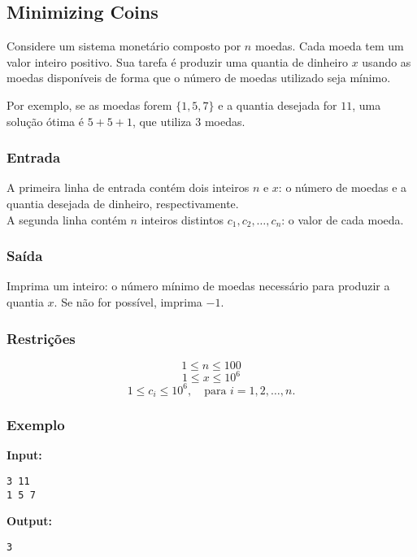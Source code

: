 \subsection{Minimizing Coins}
Considere um sistema monetário composto por \( n \) moedas. Cada moeda tem um valor inteiro positivo. Sua tarefa é produzir uma quantia de dinheiro \( x \) usando as moedas disponíveis de forma que o número de moedas utilizado seja mínimo.

Por exemplo, se as moedas forem \(\{1,5,7\}\) e a quantia desejada for \(11\), uma solução ótima é \(5+5+1\), que utiliza \(3\) moedas.

\subsubsection*{Entrada}
A primeira linha de entrada contém dois inteiros \( n \) e \( x \): o número de moedas e a quantia desejada de dinheiro, respectivamente.\\  
A segunda linha contém \( n \) inteiros distintos \( c_1, c_2, \dots, c_n \): o valor de cada moeda.

\subsubsection*{Saída}
Imprima um inteiro: o número mínimo de moedas necessário para produzir a quantia \( x \). Se não for possível, imprima \(-1\).

\subsubsection*{Restrições}
\[
1 \le n \le 100
\]
\[
1 \le x \le 10^6
\]
\[
1 \le c_i \le 10^6,\quad \text{para } i = 1, 2, \dots, n.
\]

\subsubsection*{Exemplo}

\textbf{Input:}
\begin{verbatim}
3 11
1 5 7
\end{verbatim}

\textbf{Output:}
\begin{verbatim}
3
\end{verbatim}

